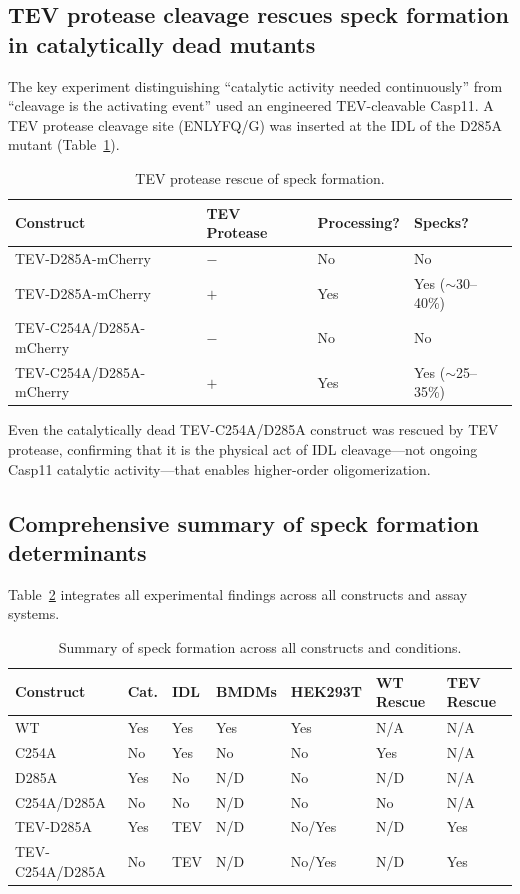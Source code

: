 \documentclass[11pt,a4paper]{article}
\begin{document}
\subsection{TEV protease cleavage rescues speck formation in catalytically dead mutants}

The key experiment distinguishing ``catalytic activity needed continuously'' from ``cleavage is the activating event'' used an engineered TEV-cleavable Casp11. A TEV protease cleavage site (ENLYFQ/G) was inserted at the IDL of the D285A mutant (Table~\ref{tab:tev}).

\begin{table}[htbp]
\centering
\caption{TEV protease rescue of speck formation.}
\label{tab:tev}
\begin{tabular}{llll}
\toprule
\textbf{Construct} & \textbf{TEV Protease} & \textbf{Processing?} & \textbf{Specks?} \\
\midrule
TEV-D285A-mCherry & $-$ & No & No \\
TEV-D285A-mCherry & $+$ & Yes & Yes ($\sim$30--40\%) \\
TEV-C254A/D285A-mCherry & $-$ & No & No \\
TEV-C254A/D285A-mCherry & $+$ & Yes & Yes ($\sim$25--35\%) \\
\bottomrule
\end{tabular}
\end{table}

Even the catalytically dead TEV-C254A/D285A construct was rescued by TEV protease, confirming that it is the physical act of IDL cleavage---not ongoing Casp11 catalytic activity---that enables higher-order oligomerization.

\subsection{Comprehensive summary of speck formation determinants}

Table~\ref{tab:master_summary} integrates all experimental findings across all constructs and assay systems.

\begin{table}[htbp]
\centering
\caption{Summary of speck formation across all constructs and conditions.}
\label{tab:master_summary}
\small
\begin{tabular}{lllllll}
\toprule
\textbf{Construct} & \textbf{Cat.} & \textbf{IDL} & \textbf{BMDMs} & \textbf{HEK293T} & \textbf{WT Rescue} & \textbf{TEV Rescue} \\
\midrule
WT & Yes & Yes & Yes & Yes & N/A & N/A \\
C254A & No & Yes & No & No & Yes & N/A \\
D285A & Yes & No & N/D & No & N/D & N/A \\
C254A/D285A & No & No & N/D & No & No & N/A \\
TEV-D285A & Yes & TEV & N/D & No/Yes & N/D & Yes \\
TEV-C254A/D285A & No & TEV & N/D & No/Yes & N/D & Yes \\
\bottomrule
\end{tabular}
\end{table}
\end{document}
